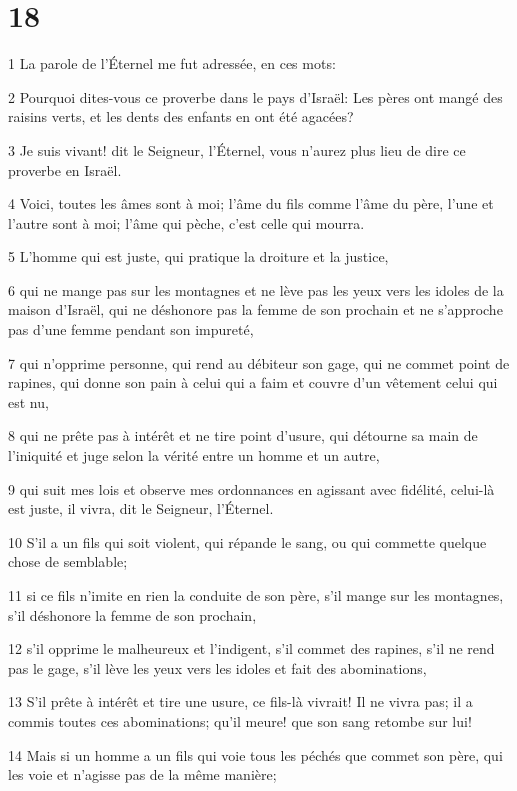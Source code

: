 \chapter{18}

\par 1 La parole de l'Éternel me fut adressée, en ces mots:
\par 2 Pourquoi dites-vous ce proverbe dans le pays d'Israël: Les pères ont mangé des raisins verts, et les dents des enfants en ont été agacées?
\par 3 Je suis vivant! dit le Seigneur, l'Éternel, vous n'aurez plus lieu de dire ce proverbe en Israël.
\par 4 Voici, toutes les âmes sont à moi; l'âme du fils comme l'âme du père, l'une et l'autre sont à moi; l'âme qui pèche, c'est celle qui mourra.
\par 5 L'homme qui est juste, qui pratique la droiture et la justice,
\par 6 qui ne mange pas sur les montagnes et ne lève pas les yeux vers les idoles de la maison d'Israël, qui ne déshonore pas la femme de son prochain et ne s'approche pas d'une femme pendant son impureté,
\par 7 qui n'opprime personne, qui rend au débiteur son gage, qui ne commet point de rapines, qui donne son pain à celui qui a faim et couvre d'un vêtement celui qui est nu,
\par 8 qui ne prête pas à intérêt et ne tire point d'usure, qui détourne sa main de l'iniquité et juge selon la vérité entre un homme et un autre,
\par 9 qui suit mes lois et observe mes ordonnances en agissant avec fidélité, celui-là est juste, il vivra, dit le Seigneur, l'Éternel.
\par 10 S'il a un fils qui soit violent, qui répande le sang, ou qui commette quelque chose de semblable;
\par 11 si ce fils n'imite en rien la conduite de son père, s'il mange sur les montagnes, s'il déshonore la femme de son prochain,
\par 12 s'il opprime le malheureux et l'indigent, s'il commet des rapines, s'il ne rend pas le gage, s'il lève les yeux vers les idoles et fait des abominations,
\par 13 S'il prête à intérêt et tire une usure, ce fils-là vivrait! Il ne vivra pas; il a commis toutes ces abominations; qu'il meure! que son sang retombe sur lui!
\par 14 Mais si un homme a un fils qui voie tous les péchés que commet son père, qui les voie et n'agisse pas de la même manière;
